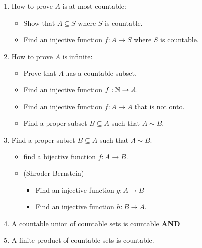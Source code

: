 \documentclass[a4paper]{report}
\begin{document}
\begin{enumerate}
    \item How to prove \( A  \) is at most countable:
        \begin{itemize}
            \item Show that \( A \subseteq S   \) where \( S  \) is countable.
            \item Find an injective function \( f: A \to S  \) where \( S  \) is countable.  
        \end{itemize}
    \item How to prove \( A  \) is infinite:
        \begin{itemize}
            \item Prove that \( A  \) has a countable subset.
            \item Find an injective function \( f: \mathbb{N} \to A  \).
            \item Find an injective function \( f: A \to A  \) that is not onto.
            \item Find a proper subset \( B \subseteq  A  \) such that \( A \sim B  \).
        \end{itemize}
    \item Find a proper subset \( B \subseteq  A   \) such that \( A \sim B  \).
        \begin{itemize}
            \item find a bijective function \( f: A \to B  \).
            \item (Shroder-Bernstein) 
                \begin{itemize}
                    \item Find an injective function \( g: A \to B  \)
                    \item Find an injective function \( h: B \to A  \).
                \end{itemize}
        \end{itemize}
\item A countable union of countable sets is countable \textbf{AND}
\item A finite product of countable sets is countable. 
\end{enumerate}
\end{document}
